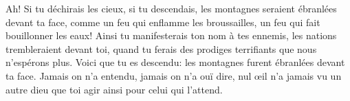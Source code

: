 Ah! Si tu déchirais les cieux, si tu descendais,
	les montagnes seraient ébranlées devant ta face,
	comme un feu qui enflamme les broussailles,
	un feu qui fait bouillonner les eaux!
Ainsi tu manifesterais ton nom à tes ennemis,
	les nations trembleraient devant toi,
	quand tu ferais des prodiges terrifiants que nous n’espérons plus.
Voici que tu es descendu:
	les montagnes furent ébranlées devant ta face.
Jamais on n’a entendu, jamais on n’a ouï dire,
	nul œil n’a jamais vu un autre dieu que toi
		agir ainsi pour celui qui l’attend.
